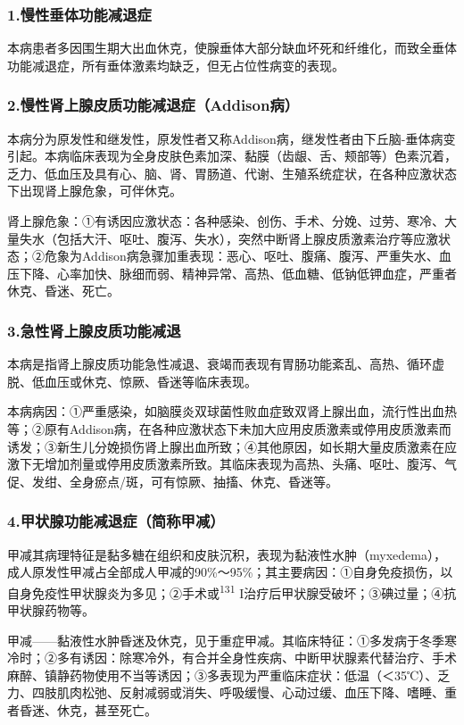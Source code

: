 \subsubsection{1.慢性垂体功能减退症}

本病患者多因围生期大出血休克，使腺垂体大部分缺血坏死和纤维化，而致全垂体功能减退症，所有垂体激素均缺乏，但无占位性病变的表现。

\subsubsection{2.慢性肾上腺皮质功能减退症（Addison病）}

本病分为原发性和继发性，原发性者又称Addison病，继发性者由下丘脑-垂体病变引起。本病临床表现为全身皮肤色素加深、黏膜（齿龈、舌、颊部等）色素沉着，乏力、低血压及具有心、脑、肾、胃肠道、代谢、生殖系统症状，在各种应激状态下出现肾上腺危象，可伴休克。

肾上腺危象：①有诱因应激状态：各种感染、创伤、手术、分娩、过劳、寒冷、大量失水（包括大汗、呕吐、腹泻、失水），突然中断肾上腺皮质激素治疗等应激状态；②危象为Addison病急骤加重表现：恶心、呕吐、腹痛、腹泻、严重失水、血压下降、心率加快、脉细而弱、精神异常、高热、低血糖、低钠低钾血症，严重者休克、昏迷、死亡。

\subsubsection{3.急性肾上腺皮质功能减退}

本病是指肾上腺皮质功能急性减退、衰竭而表现有胃肠功能紊乱、高热、循环虚脱、低血压或休克、惊厥、昏迷等临床表现。

本病病因：①严重感染，如脑膜炎双球菌性败血症致双肾上腺出血，流行性出血热等；②原有Addison病，在各种应激状态下未加大应用皮质激素或停用皮质激素而诱发；③新生儿分娩损伤肾上腺出血所致；④其他原因，如长期大量皮质激素在应激下无增加剂量或停用皮质激素所致。其临床表现为高热、头痛、呕吐、腹泻、气促、发绀、全身瘀点/斑，可有惊厥、抽搐、休克、昏迷等。

\subsubsection{4.甲状腺功能减退症（简称甲减）}

甲减其病理特征是黏多糖在组织和皮肤沉积，表现为黏液性水肿（myxedema），成人原发性甲减占全部成人甲减的90\%～95\%；其主要病因：①自身免疫损伤，以自身免疫性甲状腺炎为多见；②手术或\textsuperscript{131}
I治疗后甲状腺受破坏；③碘过量；④抗甲状腺药物等。

甲减------黏液性水肿昏迷及休克，见于重症甲减。其临床特征：①多发病于冬季寒冷时；②多有诱因：除寒冷外，有合并全身性疾病、中断甲状腺素代替治疗、手术麻醉、镇静药物使用不当等诱因；③多表现为严重临床症状：低温（＜35℃）、乏力、四肢肌肉松弛、反射减弱或消失、呼吸缓慢、心动过缓、血压下降、嗜睡、重者昏迷、休克，甚至死亡。

